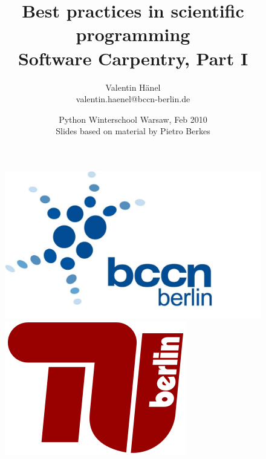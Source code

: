 \documentclass[ hyperref={colorlinks=true,filecolor=blue,linkcolor=blue,urlcolor=blue}]{beamer}
\author{Valentin H\"anel\\
        valentin.haenel@bccn-berlin.de}
\institute{Technische Universität Berlin \\
Bernstein Center for Computational Neuroscience Berlin}
\title{Best practices in scientific programming\\
Software Carpentry, Part I}
\date{Python Winterschool Warsaw, Feb 2010\\
Slides based on material by Pietro Berkes}
\begin{document}
\begin{frame}
	\titlepage
    \begin{figure}
	    \includegraphics[scale=0.05]{BCCN_logo_berlin.pdf}
	    \includegraphics[scale=0.14]{tu_logo.png}
    \end{figure}
\end{frame}


\end{document}
